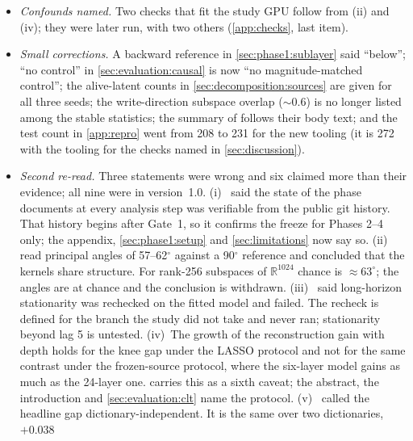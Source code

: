 \begin{itemize}
    abstract, the introduction and
    \cref{sec:evaluation} mark the causal control ladder, the operator
    analysis, the depth series and the three-axis CLT reading as post hoc.
  \item \emph{Confounds named.} Two checks that fit the study GPU follow
    from (ii) and (iv); they were later run, with two others
    (\cref{app:checks}, last item).
  \item \emph{Small corrections.} A backward reference in
    \cref{sec:phase1:sublayer} said ``below''; ``no control'' in
    \cref{sec:evaluation:causal} is now ``no magnitude-matched control'';
    the alive-latent counts in \cref{sec:decomposition:sources} are given
    for all three seeds; the write-direction subspace overlap
    (${\sim}0.6$) is no longer listed among the stable statistics; the
    summary of \citet{fernando2026dynamics} follows their body text; and
    the test count in \cref{app:repro} went from 208 to 231 for the new
    tooling (it is 272 with the tooling for the checks named in
    \cref{sec:discussion}).
  \item \emph{Second re-read.} Three statements were wrong and six claimed
    more than their evidence; all nine were in version~1.0.
    (i)~ said the state of the phase documents at every
    analysis step was verifiable from the public git history. That history
    begins after Gate~1, so it confirms the freeze for Phases 2--4 only;
    the appendix, \cref{sec:phase1:setup} and \cref{sec:limitations} now say
    so.
    (ii)~ read principal
    angles of 57--62$^\circ$ against a 90$^\circ$ reference and concluded
    that the kernels share structure. For rank-256 subspaces of
    $\mathbb{R}^{1024}$ chance is ${\approx}63^\circ$; the angles are at
    chance and the conclusion is withdrawn.
    (iii)~ said long-horizon stationarity was
    rechecked on the fitted model and failed. The recheck is defined for the
    branch the study did not take and never ran; stationarity beyond lag 5
    is untested.
    (iv)~The growth of the reconstruction gain with depth holds for the knee
    gap under the LASSO protocol and not for the same contrast under the
    frozen-source protocol, where the six-layer model gains as much as the
    24-layer one.  carries this as a sixth
    caveat; the abstract, the introduction and \cref{sec:evaluation:clt}
    name the protocol.
    (v)~ called the headline gap
    dictionary-independent. It is the same over two dictionaries, $+0.038$

\end{itemize}
